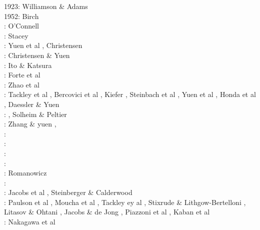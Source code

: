 \begin{scriptsize}
1923: Williamson \& Adams \cite{wiad23}\\
1952: Birch \cite{birc52}\\
\nineteenseventysix: O'Connell \cite{ocon76}\\
\nineteenseventyseven: Stacey \cite{stac77}\\
\nineteeneightytwo: Yuen et al \cite{yusb82}, Christensen \cite{chri82}\\
\nineteeneightyfive: Christensen \& Yuen \cite{chyu85}\\
\nineteeneightynine: Ito \& Katsura \cite{itka89} \\
\nineteenninetyone: Forte et al \cite{fopd91} \\
\nineteenninetytwo: Zhao et al \cite{zhyh92}\\
\nineteenninetythree: Tackley et al \cite{tasg93}, Bercovici et al \cite{best93}, 
                      Kiefer \cite{kief93}, Steinbach et al \cite{styz93},
                      Yuen et al \cite{yucc93}, Honda et al \cite{hoby93}, 
                      Daessler \& Yuen \cite{dayu93} \\
\nineteenninetyfour: \cite{vayv94}\cite{zhgu94b}\cite{styu94}, Solheim \& Peltier \cite{sope94}\\
\nineteenninetyfive: Zhang \& yuen \cite{zhyu95}, \cite{chri95}\cite{scta95}\cite{tack95}\\
\nineteenninetysix: \cite{pelt96}\cite{mitr96}\cite{tack96b}\\
\nineteenninetyseven: \cite{mifo97}\cite{pebs97}\\
\nineteenninetyeight: \cite{cava98}\cite{kenn98}\\
\nineteenninetynine: \cite{sigh99}\cite{kehv99}\cite{vaka99}\\
\nineteenninetyone: Romanowicz \cite{roma01}\\
\twothousandfive: \cite{hett05}\cite{nata05b}\cite{nabu05}\cite{stli05}\cite{stli05b}\\
\twothousandsix: Jacobs et al \cite{javd06}, Steinberger \& Calderwood \cite{stca06}\\
\twothousandseven: Paulson et al \cite{pazw07}, Moucha et al \cite{mofm07}, 
                   Tackley ey al \cite{tanh07}, Stixrude \& Lithgow-Bertelloni \cite{stli07}, 
                   Litasov \& Ohtani \cite{lioh07}, Jacobs \& de Jong \cite{jade07},
                   Piazzoni et al \cite{pisb07}, Kaban et al \cite{kart07}\\
\twothousandnine: Nakagawa et al \cite{natd09}\\

\end{scriptsize}
